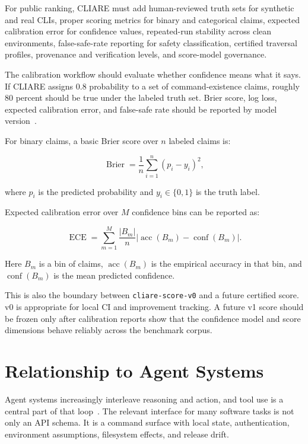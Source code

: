 \documentclass[11pt]{article}
\begin{document}
For public ranking, CLIARE must add human-reviewed truth sets for synthetic and real CLIs, proper scoring metrics for binary and categorical claims, expected calibration error for confidence values, repeated-run stability across clean environments, false-safe-rate reporting for safety classification, certified traversal profiles, provenance and verification levels, and score-model governance.

The calibration workflow should evaluate whether confidence means what it says. If CLIARE assigns 0.8 probability to a set of command-existence claims, roughly 80 percent should be true under the labeled truth set. Brier score, log loss, expected calibration error, and false-safe rate should be reported by model version~\cite{brier1950, gneiting2007, guo2017}.

For binary claims, a basic Brier score over \(n\) labeled claims is:

\[
\operatorname{Brier}
  =
  \frac{1}{n}
  \sum_{i=1}^{n}
  (p_i - y_i)^2 ,
\]

where \(p_i\) is the predicted probability and \(y_i \in \{0, 1\}\) is the truth label.

Expected calibration error over \(M\) confidence bins can be reported as:

\[
\operatorname{ECE}
  =
  \sum_{m=1}^{M}
  \frac{|B_m|}{n}
  \left|
    \operatorname{acc}(B_m) - \operatorname{conf}(B_m)
  \right|.
\]

Here \(B_m\) is a bin of claims, \(\operatorname{acc}(B_m)\) is the empirical accuracy in that bin, and \(\operatorname{conf}(B_m)\) is the mean predicted confidence.

This is also the boundary between \texttt{cliare-score-v0} and a future certified score. v0 is appropriate for local CI and improvement tracking. A future v1 score should be frozen only after calibration reports show that the confidence model and score dimensions behave reliably across the benchmark corpus.

\section{Relationship to Agent Systems}

Agent systems increasingly interleave reasoning and action, and tool use is a central part of that loop~\cite{react2022, toolformer2023}. The relevant interface for many software tasks is not only an API schema. It is a command surface with local state, authentication, environment assumptions, filesystem effects, and release drift.
\end{document}
